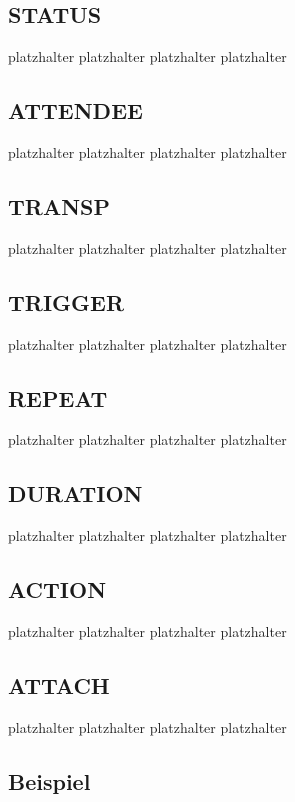 \subsection{STATUS}
\label{sec:status}
platzhalter platzhalter platzhalter platzhalter 
\subsection{ATTENDEE}
\label{sec:attendee}
platzhalter platzhalter platzhalter platzhalter 
\subsection{TRANSP}
\label{sec:transp}
platzhalter platzhalter platzhalter platzhalter 
\subsection{TRIGGER}
\label{sec:trigger}
platzhalter platzhalter platzhalter platzhalter 
\subsection{REPEAT}
\label{sec:repeat}
platzhalter platzhalter platzhalter platzhalter 
\subsection{DURATION}
\label{sec:duration}
platzhalter platzhalter platzhalter platzhalter 
\subsection{ACTION}
\label{sec:action}
platzhalter platzhalter platzhalter platzhalter 
\subsection{ATTACH}
\label{sec:attach}
platzhalter platzhalter platzhalter platzhalter 
\subsection{Beispiel}
\label{sec:beispiel_ical}
